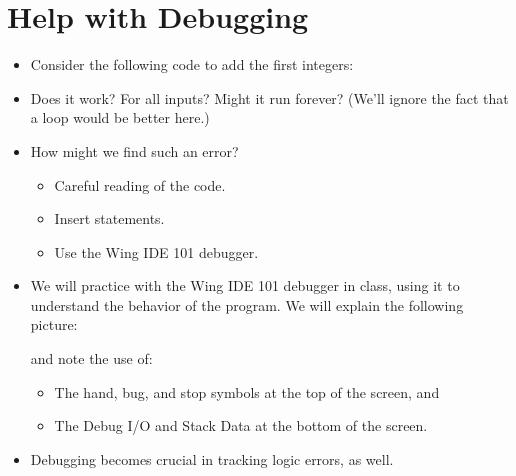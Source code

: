 \documentclass[letterpaper,10pt,english]{sphinxmanual}
\begin{document}
\section{Help with Debugging}
\label{\detokenize{lecture_notes/lec11_conditionals2:help-with-debugging}}\begin{itemize}
\item {} 
Consider the following code to add the first  integers:

\begin{sphinxVerbatim}[commandchars=\\\{\}]
  
  
  
   
      
      
 
\end{sphinxVerbatim}

\item {} 
Does it work?  For all inputs? Might it run forever? (We’ll
ignore the fact that a  loop would be better here.)

\item {} 
How might we find such an error?
\begin{itemize}
\item {} 
Careful reading of the code.

\item {} 
Insert  statements.

\item {} 
Use the Wing IDE 101 debugger.

\end{itemize}

\item {} 
We will practice with the Wing IDE 101 debugger in class, using it to
understand the behavior of the program. We will explain the following
picture:

\noindent{}

and note the use of:
\begin{itemize}
\item {} 
The hand, bug, and stop symbols at the top of the screen, and

\item {} 
The Debug I/O and Stack Data at the bottom of the screen.

\end{itemize}

\item {} 
Debugging becomes crucial in tracking logic errors, as well.

\end{itemize}
\end{document}
